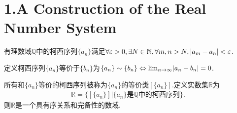 \section{1.A Construction of the Real Number System}

\begin{theorem}\label{1.A.1}
    有理数域\(\mathbb{Q}\)中的柯西序列\(\{a_n\}\)满足\(\forall \varepsilon>0, \exists N \in \mathbb{N}, \forall m,n>N, \abs*{a_m-a_n}<\varepsilon\).

    定义柯西序列\(\{a_n\}\)等价于\(\{b_n\}\)为\(\{a_n\} \sim \{b_n\} \Leftrightarrow \lim_{n \to \infty}\abs*{a_n-b_n}=0\).

    所有和\(\{a_n\}\)等价的柯西序列被称为\(\{a_n\}\)的等价类\([\{a_n\}]\).定义实数集\(\mathbb{R}\)为
    \begin{align*}
        \mathbb{R}=\{\left.[\{a_n\}]\right|\{a_n\}\text{是}\mathbb{Q}\text{中的柯西序列}\}.
    \end{align*}
    则\(\mathbb{R}\)是一个具有序关系和完备性的数域.
\end{theorem}


